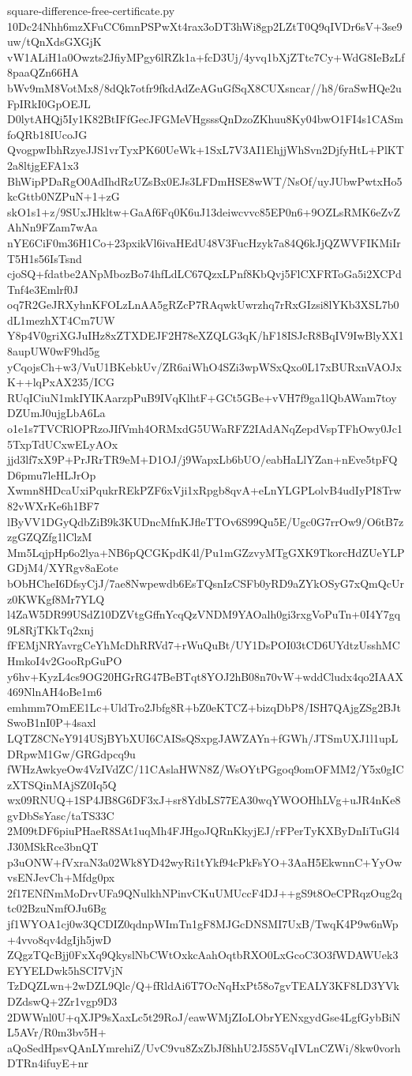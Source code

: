 \documentclass[11pt]{article}
\theoremstyle{definition}
\theoremstyle{remark}
\begin{document}
\begin{filecontents*}[overwrite]{square-difference-free-certificate.py}
10Dc24Nhh6mzXFuCC6mnPSPwXt4rax3oDT3hWi8gp2LZtT0Q9qIVDr6sV+3se9uw/tQnXdsGXGjK
vW1ALiH1a0Owzts2JfiyMPgy6lRZk1a+fcD3Uj/4yvq1bXjZTtc7Cy+WdG8IeBzLf8paaQZn66HA
bWv9mM8VotMx8/8dQk7otfr9fkdAdZeAGuGfSqX8CUXsncar//h8/6raSwHQe2uFpIRkI0GpOEJL
D0lytAHQj5Iy1K82BtIFfGecJFGMeVHgsssQnDzoZKhuu8Ky04bwO1FI4s1CASmfoQRb18IUcoJG
QvogpwIbhRzyeJJS1vrTyxPK60UeWk+1SxL7V3AI1EhjjWhSvn2DjfyHtL+PlKT2a8ltjgEFA1x3
BhWipPDaRgO0AdIhdRzUZsBx0EJs3LFDmHSE8wWT/NsOf/uyJUbwPwtxHo5kcGttb0NZPuN+1+zG
skO1s1+z/9SUxJHkltw+GaAf6Fq0K6uJ13deiwcvvc85EP0n6+9OZLsRMK6eZvZAhNn9FZam7wAa
nYE6CiF0m36H1Co+23pxikVl6ivaHEdU48V3FucHzyk7a84Q6kJjQZWVFIKMiIrT5H1s56IsTsnd
cjoSQ+fdatbe2ANpMbozBo74hfLdLC67QzxLPnf8KbQvj5FlCXFRToGa5i2XCPdTnf4e3Emlrf0J
oq7R2GeJRXyhnKFOLzLnAA5gRZcP7RAqwkUwrzhq7rRxGIzsi8lYKb3XSL7b0dL1mezhXT4Cm7UW
Y8p4V0griXGJuIHz8xZTXDEJF2H78eXZQLG3qK/hF18ISJcR8BqIV9IwBlyXX18aupUW0wF9hd5g
yCqojsCh+w3/VuU1BKebkUv/ZR6aiWhO4SZi3wpWSxQxo0L17xBURxnVAOJxK++lqPxAX235/ICG
RUqICiuN1mkIYIKAarzpPuB9IVqKlhtF+GCt5GBe+vVH7f9ga1lQbAWam7toyDZUmJ0ujgLbA6La
o1e1s7TVCRlOPRzoJIfVmh4ORMxdG5UWaRFZ2IAdANqZepdVspTFhOwy0Jc15TxpTdUCxwELyAOx
jjd3lf7xX9P+PrJRrTR9eM+D1OJ/j9WapxLb6bUO/eabHaLlYZan+nEve5tpFQD6pmu7leHLJrOp
Xwmn8HDcaUxiPqukrREkPZF6xVji1xRpgb8qvA+eLnYLGPLolvB4udIyPI8Trw82vWXrKe6h1BF7
lByVV1DGyQdbZiB9k3KUDncMfnKJfleTTOv6S99Qu5E/Ugc0G7rrOw9/O6tB7zzgGZQZfg1lClzM
Mm5LqjpHp6o2lya+NB6pQCGKpdK4l/Pu1mGZzvyMTgGXK9TkorcHdZUeYLPGDjM4/XYRgv8aEote
bObHCheI6DfsyCjJ/7ae8Nwpewdb6EsTQsnIzCSFb0yRD9aZYkOSyG7xQmQcUrz0KWKgf8Mr7YLQ
l4ZaW5DR99USdZ10DZVtgGffnYcqQzVNDM9YAOalh0gi3rxgVoPuTn+0I4Y7gq9L8RjTKkTq2xnj
fFEMjNRYavrgCeYhMcDhRRVd7+rWuQuBt/UY1DsPOI03tCD6UYdtzUsshMCHmkoI4v2GooRpGuPO
y6hv+KyzL4cs9OG20HGrRG47BeBTqt8YOJ2hB08n70vW+wddCludx4qo2IAAX469NlnAH4oBe1m6
emhmm7OmEE1Lc+UldTro2Jbfg8R+bZ0eKTCZ+bizqDbP8/ISH7QAjgZSg2BJtSwoB1nI0P+4saxl
LQTZ8CNeY914USjBYbXUI6CAISsQSxpgJAWZAYn+fGWh/JTSmUXJ1l1upLDRpwM1Gw/GRGdpcq9u
fWHzAwkyeOw4VzIVdZC/11CAslaHWN8Z/WsOYtPGgoq9omOFMM2/Y5x0gICzXTSQinMAjSZ0Iq5Q
wx09RNUQ+1SP4JB8G6DF3xJ+sr8YdbLS77EA30wqYWOOHhLVg+uJR4nKe8gvDbSsYasc/taTS33C
2M09tDF6piuPHaeR8SAt1uqMh4FJHgoJQRnKkyjEJ/rFPerTyKXByDnIiTuGl4J30MSkRce3bnQT
p3uONW+fVxraN3a02Wk8YD42wyRi1tYkf94cPkFsYO+3AaH5EkwnnC+YyOwvsENJevCh+Mfdg0px
2f17ENfNmMoDrvUFa9QNulkhNPinvCKuUMUccF4DJ++gS9t8OeCPRqzOug2qtc02BzuNmfOJu6Bg
jf1WYOA1cj0w3QCDIZ0qdnpWImTn1gF8MJGcDNSMI7UxB/TwqK4P9w6nWp+4vvo8qv4dgIjh5jwD
ZQgzTQcBjj0FxXq9QkyslNbCWtOxkcAahOqtbRXO0LxGcoC3O3fWDAWUek3EYYELDwk5hSCI7VjN
TzDQZLwn+2wDZL9Qlc/Q+fRldAi6T7OcNqHxPt58o7gvTEALY3KF8LD3YVkDZdswQ+2Zr1vgp9D3
2DWWnl0U+qXJP9sXaxLc5t29RoJ/eawWMjZIoLObrYENxgydGse4LgfGybBiNL5AVr/R0m3bv5H+
aQoSedHpsvQAnLYmrehiZ/UvC9vu8ZxZbJf8hhU2J5S5VqIVLnCZWi/8kw0vorhDTRn4ifuyE+nr

\end{filecontents*}
\end{document}

